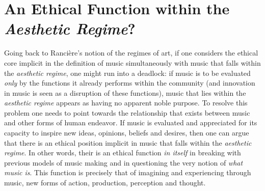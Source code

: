 \section{An Ethical Function within the \emph{Aesthetic Regime}?}

Going back to Ranci\`{e}re's notion of the regimes of art, if one considers the ethical core implicit in the definition of music simultaneously with music that falls within the \emph{aesthetic regime}, one might run into a deadlock: if music is to be evaluated \emph{only} by the functions it already performs within the community (and innovation in music is seen as a disruption of these functions), music that lies within the \emph{aesthetic regime} appears as having no apparent noble purpose. To resolve this problem one needs to point towards the relationship that exists between music and other forms of human endeavor. If music is evaluated and appreciated for its capacity to inspire new ideas, opinions, beliefs and desires, then one can argue that there is an ethical position implicit in music that falls within the \emph{aesthetic regime}. In other words, their is an ethical function \emph{in itself} in breaking with previous models of music making and in questioning the very notion of \emph{what music is}. This function is precisely that of imagining and experiencing through music, new forms of action, production, perception and thought.

